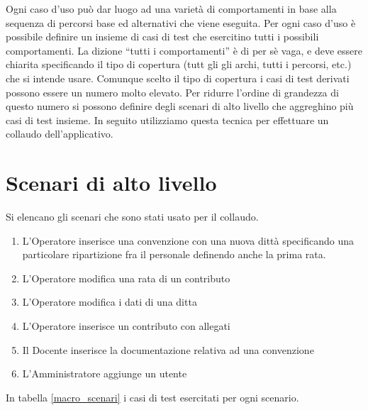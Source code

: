 Ogni caso d'uso può dar luogo ad una varietà di comportamenti in base alla sequenza di percorsi base ed alternativi che viene eseguita.
Per ogni caso d'uso è possibile definire un insieme di casi di test che esercitino tutti i possibili comportamenti. La dizione  ``tutti i comportamenti'' è di per sè vaga, e deve essere chiarita specificando il tipo di 
copertura (tutt gli gli archi, tutti i percorsi, etc.) che si intende usare. Comunque scelto il tipo di copertura i casi di test derivati possono essere un numero molto elevato. Per ridurre l'ordine di grandezza di questo numero
si possono definire degli scenari di alto livello che aggreghino più casi di test insieme. In seguito utilizziamo questa tecnica per effettuare un collaudo dell'applicativo.

\section{Scenari di alto livello}
Si elencano gli scenari che sono stati usato per il collaudo.

\begin{enumerate}
 \item L'Operatore inserisce una convenzione con una nuova dittà specificando una particolare ripartizione fra il personale definendo anche la prima rata. \label{MS1}
 \item L'Operatore modifica una rata di un contributo \label{MS2}
 \item L'Operatore modifica i dati di una ditta \label{MS3}
 \item L'Operatore inserisce un contributo con allegati \label{MS4}
 \item Il Docente inserisce la documentazione relativa ad una convenzione \label{MS5}
 \item L'Amministratore aggiunge un utente \label{MS6}
\end{enumerate}

In tabella \ref{macro_scenari} i casi di test esercitati per ogni scenario.\\


